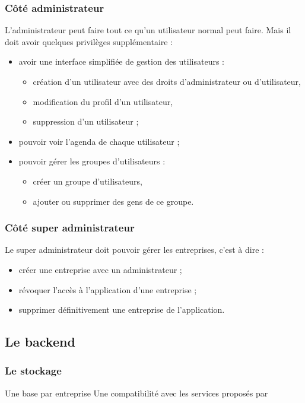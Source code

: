 \documentclass[a4paper, 11pt]{report}
\begin{document}
        \subsubsection{Côté administrateur}
        L'administrateur peut faire tout ce qu'un utilisateur normal peut faire. Mais il doit avoir quelques privilèges supplémentaire :
        \begin{itemize}
            \item avoir une interface simplifiée de gestion des utilisateurs :
            \begin{itemize}
                \item création d'un utilisateur avec des droits d'administrateur ou d'utilisateur,
                \item modification du profil d'un utilisateur,
                \item suppression d'un utilisateur ;
            \end{itemize}
            \item pouvoir voir l'agenda de chaque utilisateur ;
            \item pouvoir gérer les groupes d'utilisateurs :
            \begin{itemize}
                \item créer un groupe d'utilisateurs,
                \item ajouter ou supprimer des gens de ce groupe.
            \end{itemize}
        \end{itemize}
        \subsubsection{Côté super administrateur}
        Le super administrateur doit pouvoir gérer les entreprises, c'est à dire :
        \begin{itemize}
            \item créer une entreprise avec un administrateur ;
            \item révoquer l'accès à l'application d'une entreprise ;
            \item supprimer définitivement une entreprise de l'application.
        \end{itemize}
    \subsection{Le backend}
        \subsubsection{Le stockage}
        Une base par entreprise
        Une compatibilité avec les services proposés par \oswitch
\end{document}
